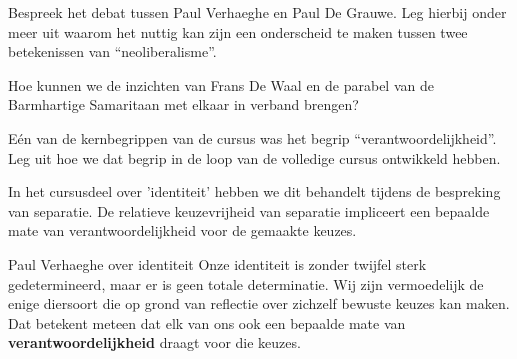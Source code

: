 \documentclass[main.tex]{subfiles}
\begin{document}
\begin{examenvraag}
    \begin{vraag}
        Bespreek het debat tussen Paul Verhaeghe en Paul De Grauwe. Leg hierbij onder meer uit waarom het nuttig kan zijn een onderscheid te maken tussen twee betekenissen van “neoliberalisme”.
    \end{vraag}

    \begin{antwoord}
    \end{antwoord}
\end{examenvraag}


\begin{examenvraag}
    \begin{vraag}
        Hoe kunnen we de inzichten van Frans De Waal en de parabel van de Barmhartige Samaritaan met elkaar in verband brengen?
    \end{vraag}

    \begin{antwoord}
    \end{antwoord}
\end{examenvraag}


\begin{examenvraag}
    \begin{vraag}
        Eén van de kernbegrippen van de cursus was het begrip “verantwoordelijkheid”. Leg uit hoe we dat begrip in de loop van de volledige cursus ontwikkeld hebben.
    \end{vraag}

    \begin{antwoord}
    In het cursusdeel over 'identiteit' hebben we dit behandelt tijdens de bespreking van separatie.
    De relatieve keuzevrijheid van separatie impliceert een bepaalde mate van verantwoordelijkheid voor de gemaakte keuzes.
    \end{antwoord}
    \begin{citaat}{Paul Verhaeghe over identiteit}
    Onze
identiteit is zonder twijfel sterk gedetermineerd, maar er is geen totale determinatie. Wij zijn
vermoedelijk de enige diersoort die op grond van reflectie over zichzelf bewuste keuzes kan maken.
Dat betekent meteen dat elk van ons ook een bepaalde mate van \textbf{verantwoordelijkheid} draagt voor die
keuzes. 
    \end{citaat}
\end{examenvraag}
\end{document}

